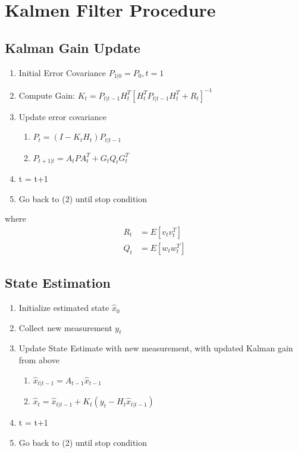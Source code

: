 \documentclass[12pt, letterpaper]{amsart} %
\numberwithin{equation}{section}
\begin{document}
\section{Kalmen Filter Procedure}
\subsection{Kalman Gain Update}
\begin{enumerate}
\item Initial Error Covariance $P_{1|0} = P_0, t = 1$
\item Compute Gain: $K_t = P_{t|t-1} H_t^T [H_t^T P_{t|t-1} H_t^T + R_t]^{-1}$
\item Update error covariance
  \begin{enumerate}
  \item $P_t = (I-K_tH_t)P_{t|t-1}$
  \item $P_{t+1|t} = A_t P A_t^T + G_t Q_t G_t^T$
  \end{enumerate}
\item t = t+1
\item Go back to (2) until stop condition
\end{enumerate}
where
\begin{align*}
  R_t &= E[v_t v_t^T] \\
  Q_t &= E[w_t w_t^T]
\end{align*}

\subsection{State Estimation}
\begin{enumerate}
\item Initialize estimated state $\hat{x}_0$
\item Collect new measurement $y_t$
\item Update State Estimate with new measurement, with updated Kalman gain from above
  \begin{enumerate}
  \item $\hat{x}_{t|t-1} = A_{t-1} \hat{x}_{t-1}$ 
  \item $\hat{x}_t = \hat{x}_{t|t-1} + K_t(y_t - H_t \hat{x}_{t|t-1})$
  \end{enumerate}
\item t = t+1
\item Go back to (2) until stop condition  
\end{enumerate}
\end{document}
